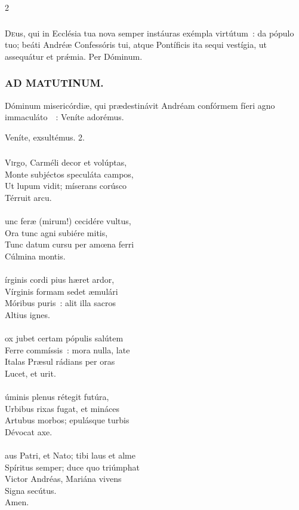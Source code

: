 \documentclass[9pt,twoside]{extarticle}
\begin{document}
\begin{multicols}{2}
{{\subsubsection*{\center {}}
\lettrine{D}eus, qui in Ecclésia tua nova semper instáuras exémpla virtútum~: da pópulo tuo; beáti Andréæ Confessóris tui, atque Pontíficis ita sequi vestígia, ut assequátur et prǽmia. Per Dóminum.

\subsubsection*{\center \textsc{AD MATUTINUM.}}
\begin{tightlist}{}
\item {} Dóminum misericórdiæ, qui prædestinávit Andréam confórmem fíeri agno immaculáto~~: \textred{*} Veníte adorémus.
\item {} Veníte, exsultémus. 2.
\end{tightlist}

\subsubsection*{\center {}}
\lettrine{V}irgo, Carméli decor et volúptas,\\
Monte subjéctos speculáta campos,\\
Ut lupum vidit; míserans corúsco\\
Térruit arcu.\\
\\
unc feræ (mirum!) cecidére vultus,\\
Ora tunc agni subiére mitis,\\
Tunc datum cursu per amœna ferri\\
Cúlmina montis.\\
\\
írginis cordi pius hæret ardor,\\
Vírginis formam sedet æmulári\\
Móribus puris~: alit illa sacros\\
Altius ignes.\\
\\
ox jubet certam pópulis salútem\\
Ferre commíssis~: mora nulla, late\\
Italas Præsul rádians per oras\\
Lucet, et urit.\\
\\
úminis plenus rétegit futúra,\\
Urbibus rixas fugat, et mináces\\
Artubus morbos; epulásque turbis\\
Dévocat axe.\\
\\
aus Patri, et Nato; tibi laus et alme\\
Spíritus semper; duce quo triúmphat\\
Victor Andréas, Mariána vivens\\
Signa secútus.\\
Amen.

}}
\end{multicols}
\end{document}
